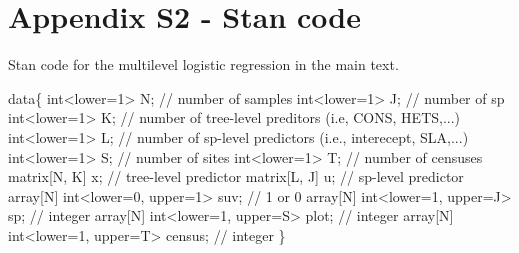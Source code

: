 \documentclass[
  12pt,
  letterpaper,
  DIV=11,
  numbers=noendperiod]{scrartcl}
\newenvironment{Shaded}{\begin{snugshade}}{\end{snugshade}}
\newcommand{\CommentTok}[1]{\textcolor[rgb]{0.37,0.37,0.37}{#1}}
\newcommand{\DataTypeTok}[1]{\textcolor[rgb]{0.68,0.00,0.00}{#1}}
\newcommand{\DecValTok}[1]{\textcolor[rgb]{0.68,0.00,0.00}{#1}}
\newcommand{\KeywordTok}[1]{\textcolor[rgb]{0.00,0.23,0.31}{#1}}
\newcommand{\NormalTok}[1]{\textcolor[rgb]{0.00,0.23,0.31}{#1}}
\begin{document}
\newpage

\hypertarget{appendix-s2---stan-code}{%
\section{Appendix S2 - Stan code}\label{appendix-s2---stan-code}}

Stan code for the multilevel logistic regression in the main text.

\begin{Shaded}
\begin{Highlighting}[]
\KeywordTok{data}\NormalTok{\{}
  \DataTypeTok{int}\NormalTok{\textless{}}\KeywordTok{lower}\NormalTok{=}\DecValTok{1}\NormalTok{\textgreater{} N; }\CommentTok{// number of samples}
  \DataTypeTok{int}\NormalTok{\textless{}}\KeywordTok{lower}\NormalTok{=}\DecValTok{1}\NormalTok{\textgreater{} J; }\CommentTok{// number of sp}
  \DataTypeTok{int}\NormalTok{\textless{}}\KeywordTok{lower}\NormalTok{=}\DecValTok{1}\NormalTok{\textgreater{} K; }\CommentTok{// number of tree{-}level preditors (i.e, CONS, HETS,...)}
  \DataTypeTok{int}\NormalTok{\textless{}}\KeywordTok{lower}\NormalTok{=}\DecValTok{1}\NormalTok{\textgreater{} L; }\CommentTok{// number of sp{-}level predictors (i.e., interecept, SLA,...)}
  \DataTypeTok{int}\NormalTok{\textless{}}\KeywordTok{lower}\NormalTok{=}\DecValTok{1}\NormalTok{\textgreater{} S; }\CommentTok{// number of sites}
  \DataTypeTok{int}\NormalTok{\textless{}}\KeywordTok{lower}\NormalTok{=}\DecValTok{1}\NormalTok{\textgreater{} T; }\CommentTok{// number of censuses}
  \DataTypeTok{matrix}\NormalTok{[N, K] x; }\CommentTok{// tree{-}level predictor}
  \DataTypeTok{matrix}\NormalTok{[L, J] u; }\CommentTok{// sp{-}level predictor}
  \DataTypeTok{array}\NormalTok{[N] }\DataTypeTok{int}\NormalTok{\textless{}}\KeywordTok{lower}\NormalTok{=}\DecValTok{0}\NormalTok{, }\KeywordTok{upper}\NormalTok{=}\DecValTok{1}\NormalTok{\textgreater{} suv; }\CommentTok{// 1 or 0}
  \DataTypeTok{array}\NormalTok{[N] }\DataTypeTok{int}\NormalTok{\textless{}}\KeywordTok{lower}\NormalTok{=}\DecValTok{1}\NormalTok{, }\KeywordTok{upper}\NormalTok{=J\textgreater{} sp; }\CommentTok{// integer}
  \DataTypeTok{array}\NormalTok{[N] }\DataTypeTok{int}\NormalTok{\textless{}}\KeywordTok{lower}\NormalTok{=}\DecValTok{1}\NormalTok{, }\KeywordTok{upper}\NormalTok{=S\textgreater{} plot; }\CommentTok{// integer}
  \DataTypeTok{array}\NormalTok{[N] }\DataTypeTok{int}\NormalTok{\textless{}}\KeywordTok{lower}\NormalTok{=}\DecValTok{1}\NormalTok{, }\KeywordTok{upper}\NormalTok{=T\textgreater{} census; }\CommentTok{// integer}
\NormalTok{\}}


\end{Highlighting}
\end{Shaded}
\end{document}
